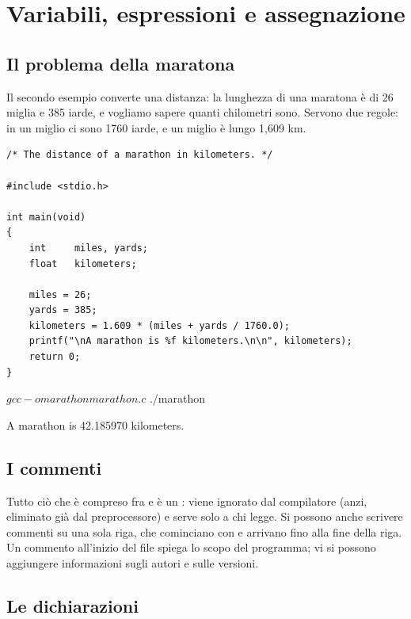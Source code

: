 \section{Variabili, espressioni e assegnazione}

\subsection{Il problema della maratona}

Il secondo esempio converte una distanza: la lunghezza di una maratona è di
26 miglia e 385 iarde, e vogliamo sapere quanti chilometri sono. Servono due
regole: in un miglio ci sono 1760 iarde, e un miglio è lungo 1,609 km.

\begin{affianco}[0.56]
\begin{lstlisting}[style=c, name=marathon.c]
/* The distance of a marathon in kilometers. */

#include <stdio.h>

int main(void)
{
    int     miles, yards;
    float   kilometers;

    miles = 26;
    yards = 385;
    kilometers = 1.609 * (miles + yards / 1760.0);
    printf("\nA marathon is %f kilometers.\n\n", kilometers);
    return 0;
}
\end{lstlisting}
\risultato
\begin{console}
$ gcc -o marathon marathon.c
$ ./marathon

A marathon is 42.185970 kilometers.

\end{console}
\end{affianco}

\subsection{I commenti}

Tutto ciò che è compreso fra \code{/*} e \code{*/} è un
: viene ignorato dal compilatore (anzi, eliminato già dal
preprocessore) e serve solo a chi legge. Si possono anche scrivere commenti
su una sola riga, che cominciano con \code{//} e arrivano fino alla fine
della riga. Un commento all'inizio del file spiega lo scopo del programma;
vi si possono aggiungere informazioni sugli autori e sulle versioni.

\subsection{Le dichiarazioni}

